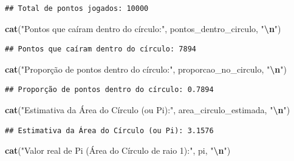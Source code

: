 \documentclass[
]{book}
\newenvironment{Shaded}{\begin{snugshade}}{\end{snugshade}}
\newcommand{\FunctionTok}[1]{\textcolor[rgb]{0.13,0.29,0.53}{\textbf{#1}}}
\newcommand{\NormalTok}[1]{#1}
\newcommand{\SpecialCharTok}[1]{\textcolor[rgb]{0.81,0.36,0.00}{\textbf{#1}}}
\newcommand{\StringTok}[1]{\textcolor[rgb]{0.31,0.60,0.02}{#1}}
\begin{document}
\begin{verbatim}
## Total de pontos jogados: 10000
\end{verbatim}

\begin{Shaded}
\begin{Highlighting}[]
\FunctionTok{cat}\NormalTok{(}\StringTok{"Pontos que caíram dentro do círculo:"}\NormalTok{, pontos\_dentro\_circulo, }\StringTok{"}\SpecialCharTok{\textbackslash{}n}\StringTok{"}\NormalTok{)}
\end{Highlighting}
\end{Shaded}

\begin{verbatim}
## Pontos que caíram dentro do círculo: 7894
\end{verbatim}

\begin{Shaded}
\begin{Highlighting}[]
\FunctionTok{cat}\NormalTok{(}\StringTok{"Proporção de pontos dentro do círculo:"}\NormalTok{, proporcao\_no\_circulo, }\StringTok{"}\SpecialCharTok{\textbackslash{}n}\StringTok{"}\NormalTok{)}
\end{Highlighting}
\end{Shaded}

\begin{verbatim}
## Proporção de pontos dentro do círculo: 0.7894
\end{verbatim}

\begin{Shaded}
\begin{Highlighting}[]
\FunctionTok{cat}\NormalTok{(}\StringTok{"Estimativa da Área do Círculo (ou Pi):"}\NormalTok{, area\_circulo\_estimada, }\StringTok{"}\SpecialCharTok{\textbackslash{}n}\StringTok{"}\NormalTok{)}
\end{Highlighting}
\end{Shaded}

\begin{verbatim}
## Estimativa da Área do Círculo (ou Pi): 3.1576
\end{verbatim}

\begin{Shaded}
\begin{Highlighting}[]
\FunctionTok{cat}\NormalTok{(}\StringTok{"Valor real de Pi (Área do Círculo de raio 1):"}\NormalTok{, pi, }\StringTok{"}\SpecialCharTok{\textbackslash{}n}\StringTok{"}\NormalTok{)}
\end{Highlighting}
\end{Shaded}
\end{document}
